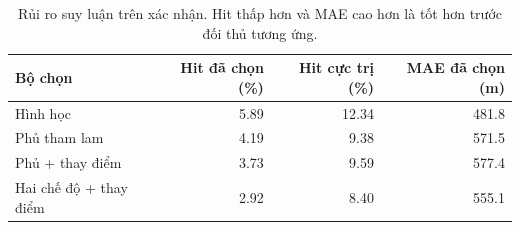 \begin{table}[htbp]
\centering\small
\caption{Rủi ro suy luận trên xác nhận. Hit thấp hơn và MAE cao hơn là tốt hơn trước đối thủ tương ứng.}
\label{tab:fresh-privacy}
\begin{tabular}{lrrr}
\toprule
Bộ chọn & Hit đã chọn (\%) & Hit cực trị (\%) & MAE đã chọn (m) \\
\midrule
Hình học & 5.89 & 12.34 & 481.8 \\
Phủ tham lam & 4.19 & 9.38 & 571.5 \\
Phủ + thay điểm & 3.73 & 9.59 & 577.4 \\
Hai chế độ + thay điểm & 2.92 & 8.40 & 555.1 \\
\bottomrule
\end{tabular}
\end{table}
